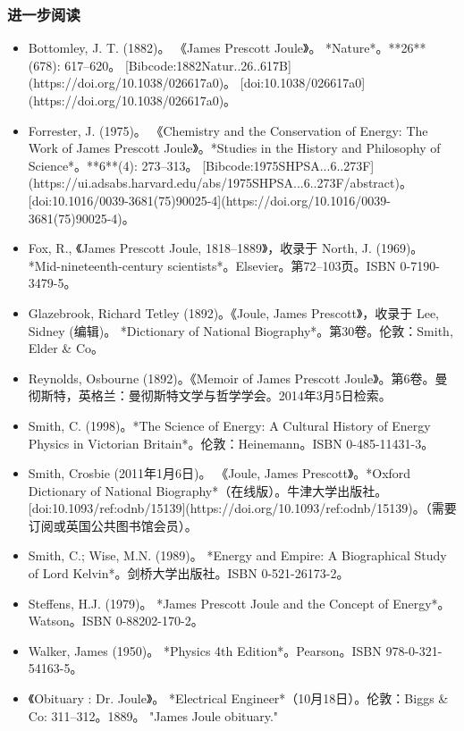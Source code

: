 \subsubsection{进一步阅读}
\begin{itemize}
\item Bottomley, J. T. (1882)。 《James Prescott Joule》。 *Nature*。**26** (678): 617–620。 [Bibcode:1882Natur..26..617B](https://doi.org/10.1038/026617a0)。 [doi:10.1038/026617a0](https://doi.org/10.1038/026617a0)。
\item Forrester, J. (1975)。 《Chemistry and the Conservation of Energy: The Work of James Prescott Joule》。*Studies in the History and Philosophy of Science*。**6**(4): 273–313。 [Bibcode:1975SHPSA...6..273F](https://ui.adsabs.harvard.edu/abs/1975SHPSA...6..273F/abstract)。 [doi:10.1016/0039-3681(75)90025-4](https://doi.org/10.1016/0039-3681(75)90025-4)。
\item Fox, R., 《James Prescott Joule, 1818–1889》，收录于 North, J. (1969)。 *Mid-nineteenth-century scientists*。Elsevier。第72–103页。ISBN 0-7190-3479-5。
\item Glazebrook, Richard Tetley (1892)。《Joule, James Prescott》，收录于 Lee, Sidney (编辑)。 *Dictionary of National Biography*。第30卷。伦敦：Smith, Elder & Co。
\item Reynolds, Osbourne (1892)。《Memoir of James Prescott Joule》。第6卷。曼彻斯特，英格兰：曼彻斯特文学与哲学学会。2014年3月5日检索。
\item Smith, C. (1998)。*The Science of Energy: A Cultural History of Energy Physics in Victorian Britain*。伦敦：Heinemann。ISBN 0-485-11431-3。
\item Smith, Crosbie (2011年1月6日)。 《Joule, James Prescott》。*Oxford Dictionary of National Biography*（在线版）。牛津大学出版社。[doi:10.1093/ref:odnb/15139](https://doi.org/10.1093/ref:odnb/15139)。（需要订阅或英国公共图书馆会员）。
\item Smith, C.; Wise, M.N. (1989)。 *Energy and Empire: A Biographical Study of Lord Kelvin*。剑桥大学出版社。ISBN 0-521-26173-2。
\item Steffens, H.J. (1979)。 *James Prescott Joule and the Concept of Energy*。Watson。ISBN 0-88202-170-2。
\item Walker, James (1950)。 *Physics 4th Edition*。Pearson。ISBN 978-0-321-54163-5。
\item 《Obituary : Dr. Joule》。 *Electrical Engineer*（10月18日）。伦敦：Biggs & Co: 311–312。1889。 "James Joule obituary."
\end{itemize}
